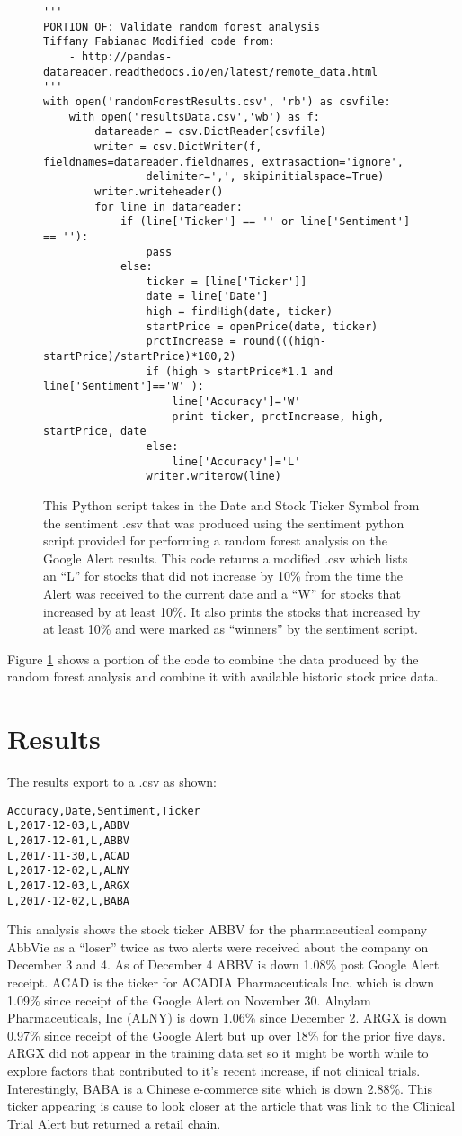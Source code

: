 \documentclass[sigconf]{acmart}
\begin{document}
\begin{figure}[htb]
\begin{verbatim}
'''
PORTION OF: Validate random forest analysis
Tiffany Fabianac Modified code from:
    - http://pandas-datareader.readthedocs.io/en/latest/remote_data.html
'''
with open('randomForestResults.csv', 'rb') as csvfile:
	with open('resultsData.csv','wb') as f:
		datareader = csv.DictReader(csvfile)
		writer = csv.DictWriter(f, fieldnames=datareader.fieldnames, extrasaction='ignore', 
				delimiter=',', skipinitialspace=True)
		writer.writeheader()
		for line in datareader:
			if (line['Ticker'] == '' or line['Sentiment'] == ''):
				pass
			else:
				ticker = [line['Ticker']]
				date = line['Date']
				high = findHigh(date, ticker)
				startPrice = openPrice(date, ticker)
				prctIncrease = round(((high-startPrice)/startPrice)*100,2)
				if (high > startPrice*1.1 and line['Sentiment']=='W' ):
					line['Accuracy']='W'
					print ticker, prctIncrease, high, startPrice, date
				else:
					line['Accuracy']='L'
				writer.writerow(line)
\end{verbatim}
\caption{This Python script takes in the Date and Stock Ticker Symbol from the sentiment .csv that was produced using the sentiment python script provided for performing a random forest analysis on the Google Alert results. This code returns a modified .csv which lists an ``L'' for stocks that did not increase by 10\% from the time the Alert was received to the current date and a ``W'' for stocks that increased by at least 10\%. It also prints the stocks that increased by at least 10\%  and were marked as ``winners'' by the sentiment script.}\label{c:result}
\end{figure}

Figure \ref{c:result} shows a portion of the code to combine the data produced by the random forest analysis and combine it with available historic stock price data.


\section{Results}
The results export to a .csv as shown:
\begin{verbatim}
Accuracy,Date,Sentiment,Ticker
L,2017-12-03,L,ABBV
L,2017-12-01,L,ABBV
L,2017-11-30,L,ACAD
L,2017-12-02,L,ALNY
L,2017-12-03,L,ARGX
L,2017-12-02,L,BABA
\end{verbatim}
This analysis shows the stock ticker ABBV for the pharmaceutical company AbbVie as a ``loser'' twice as two alerts were received about the company on December 3 and 4. As of December 4 ABBV is down 1.08\% post Google Alert receipt. ACAD is the ticker for ACADIA Pharmaceuticals Inc. which is down 1.09\% since receipt of the Google Alert on November 30. Alnylam Pharmaceuticals, Inc (ALNY) is down 1.06\% since December 2. ARGX is down 0.97\% since receipt of the Google Alert but up over 18\% for the prior five days. ARGX did not appear in the training data set so it might be worth while to explore factors that contributed to it's recent increase, if not clinical trials. Interestingly, BABA is a Chinese e-commerce site which is down 2.88\%. This ticker appearing is cause to look closer at the article that was link to the Clinical Trial Alert but returned a retail chain.
\end{document}

